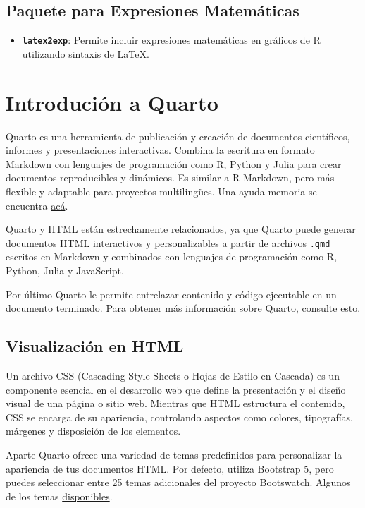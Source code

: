 \documentclass[
  10pt,
]{article}
\providecommand{\tightlist}{%
  \setlength{\itemsep}{0pt}\setlength{\parskip}{0pt}}\usepackage{longtable,booktabs,array}
\begin{document}
\subsection{Paquete para Expresiones
Matemáticas}\label{paquete-para-expresiones-matemuxe1ticas}

\begin{itemize}
\tightlist
\item
  \textbf{\texttt{latex2exp}}: Permite incluir expresiones matemáticas
  en gráficos de R utilizando sintaxis de LaTeX.
\end{itemize}

\section{Introdución a Quarto}\label{introduciuxf3n-a-quarto}

Quarto es una herramienta de publicación y creación de documentos
científicos, informes y presentaciones interactivas. Combina la
escritura en formato Markdown con lenguajes de programación como R,
Python y Julia para crear documentos reproducibles y dinámicos. Es
similar a R Markdown, pero más flexible y adaptable para proyectos
multilingües. Una ayuda memoria se encuentra
\href{https://rstudio.github.io/cheatsheets/quarto.pdf}{acá}.

Quarto y HTML están estrechamente relacionados, ya que Quarto puede
generar documentos HTML interactivos y personalizables a partir de
archivos \texttt{.qmd} escritos en Markdown y combinados con lenguajes
de programación como R, Python, Julia y JavaScript.

Por último Quarto le permite entrelazar contenido y código ejecutable en
un documento terminado. Para obtener más información sobre Quarto,
consulte \href{https://quarto.org}{esto}.

\subsection{Visualización en HTML}\label{visualizaciuxf3n-en-html}

Un archivo CSS (Cascading Style Sheets o Hojas de Estilo en Cascada) es
un componente esencial en el desarrollo web que define la presentación y
el diseño visual de una página o sitio web. Mientras que HTML estructura
el contenido, CSS se encarga de su apariencia, controlando aspectos como
colores, tipografías, márgenes y disposición de los elementos.

Aparte Quarto ofrece una variedad de temas predefinidos para
personalizar la apariencia de tus documentos HTML. Por defecto, utiliza
Bootstrap 5, pero puedes seleccionar entre 25 temas adicionales del
proyecto Bootswatch. Algunos de los temas
\href{https://quarto.org/docs/output-formats/html-themes.html\#theme-options}{disponibles}.
\end{document}
